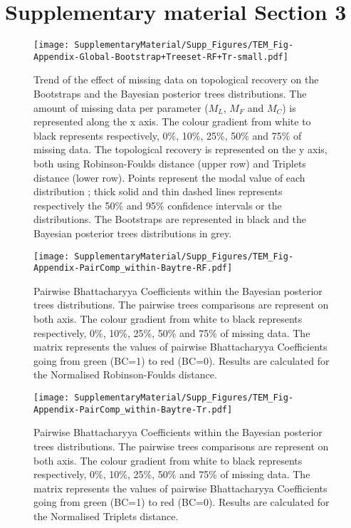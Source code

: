 \section{Supplementary material Section 3}

\begin{figure} 
\centering
    \texttt{[image: SupplementaryMaterial/Supp\_Figures/TEM\_Fig-Appendix-Global-Bootstrap+Treeset-RF+Tr-small.pdf]}
\caption{Trend of the effect of missing data on topological recovery on the Bootstraps and the Bayesian posterior trees distributions. The amount of missing data per parameter ($M_{L}$, $M_{F}$ and $M_{C}$) is represented along the x axis. The colour gradient from white to black represents respectively, 0\%, 10\%, 25\%, 50\% and 75\% of missing data. The topological recovery is represented on the y axis, both using Robinson-Foulds distance (upper row) and Triplets distance (lower row). Points represent the modal value of each distribution ; thick solid and thin dashed lines represents respectively the 50\% and 95\% confidence intervals or the distributions. The Bootstraps are represented in black and the Bayesian posterior trees distributions in grey.}
\label{Fig_global_BootTreesets} %
\end{figure}

\begin{figure} 
\centering
    \texttt{[image: SupplementaryMaterial/Supp\_Figures/TEM\_Fig-Appendix-PairComp\_within-Baytre-RF.pdf]}
\caption{Pairwise Bhattacharyya Coefficients within the Bayesian posterior trees distributions. The pairwise trees comparisons are represent on both axis. The colour gradient from white to black represents respectively, 0\%, 10\%, 25\%, 50\% and 75\% of missing data. The matrix represents the values of pairwise Bhattacharyya Coefficients going from green (BC=1) to red (BC=0). Results are calculated for the Normalised Robinson-Foulds distance.}
\label{Fig_pairComp-Baytree-RF}
\end{figure} %

\begin{figure} 
\centering
    \texttt{[image: SupplementaryMaterial/Supp\_Figures/TEM\_Fig-Appendix-PairComp\_within-Baytre-Tr.pdf]}
\caption{Pairwise Bhattacharyya Coefficients within the Bayesian posterior trees distributions. The pairwise trees comparisons are represent on both axis. The colour gradient from white to black represents respectively, 0\%, 10\%, 25\%, 50\% and 75\% of missing data. The matrix represents the values of pairwise Bhattacharyya Coefficients going from green (BC=1) to red (BC=0). Results are calculated for the Normalised Triplets distance.}
\label{Fig_pairComp-Baytree-Tr}
\end{figure} %

